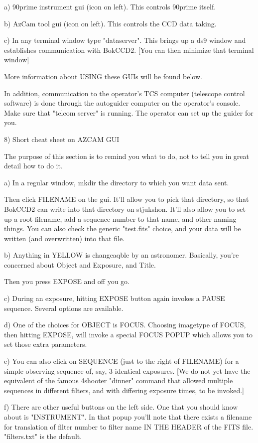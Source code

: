 \documentclass[letterpaper,12pt]{article}
\begin{document}
a) 90prime instrument gui (icon on left). This controls 90prime
itself.

b) AzCam tool gui (icon on left). This controls the CCD data
taking.

c) In any terminal window type "dataserver". This brings up
a ds9 window and establishes communication with BokCCD2.
[You can then minimize that terminal window]

More information about USING these GUIs will be found below.

In addition, communication to the operator's TCS computer
(telescope control software) is done through the autoguider
computer on the operator's console. Make sure that "telcom
server" is running. The operator can set up the guider
for you.


8) Short cheat sheet on AZCAM GUI

The purpose of this section is to remind you what to do,
not to tell you in great detail how to do it.

a) In a regular window, mkdir the directory to which you want data sent.

   Then click FILENAME on the gui. It'll allow you
   to pick that directory, so that BokCCD2 can write into that
   directory on stjukshon. It'll also allow you
   to set up a root filename, add a sequence number to that name,
   and other naming things. You can also check the generic
   "test.fits" choice, and your data will be written (and overwritten)
   into that file.

b) Anything in YELLOW is changeaqble by an astronomer.
   Basically, you're concerned about Object and Exposure,
   and Title.

   Then you press EXPOSE and off you go.

c) During an exposure, hitting EXPOSE button again invokes
   a PAUSE sequence. Several options are available.

d) One of the choices for OBJECT is FOCUS. Choosing imagetype
   of FOCUS, then hitting EXPOSE, will invoke a special
   FOCUS POPUP which allows you to set those extra parameters.

e) You can also click on SEQUENCE (just to the right of FILENAME)
   for a simple observing sequence of, say, 3 identical exposures.
   [We do not yet have the equivalent of the famous 4shooter
    "dinner" command that allowed multiple sequences in different
    filters, and with differing exposure times, to be invoked.]

f) There are other useful buttons on the left side. One that
   you should know about is "INSTRUMENT". In that popup you'll
   note that there exists a filename for translation of filter
   number to filter name IN THE HEADER of the FITS file.
   "filters.txt" is the default.
\end{document}
